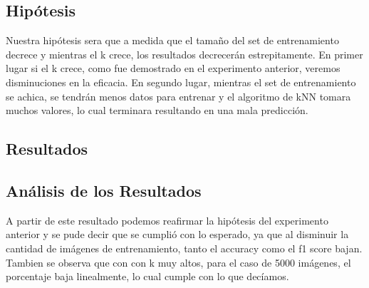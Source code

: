 \subsection{Hipótesis}

Nuestra hipótesis sera que a medida que el tamaño del set de entrenamiento decrece y mientras el k crece, los resultados decrecerán estrepitamente. En primer lugar si el k crece, como fue demostrado en el experimento anterior, veremos disminuciones en la eficacia. En segundo lugar, mientras el set de entrenamiento se achica, se tendrán menos datos para entrenar y el algoritmo de kNN tomara muchos valores, lo cual terminara resultando en una mala predicción.

\subsection{Resultados}


\subsection{Análisis de los Resultados}

A partir de este resultado podemos reafirmar la hipótesis del experimento anterior y se pude decir que se cumplió con lo esperado, ya que al disminuir la cantidad de imágenes de entrenamiento, tanto el accuracy como el f1 score bajan. Tambien se observa que con con k muy altos, para el caso de 5000 imágenes, el porcentaje baja linealmente, lo cual cumple con lo que decíamos.
